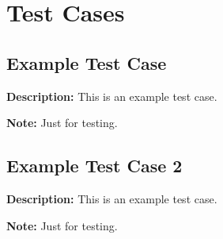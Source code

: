 \chapter{Test Cases}
\section{Example Test Case}\label{TESTCASEExampleTestcase}
\textbf{Description:} This is an example test case.

\textbf{Note:} Just for testing.
\section{Example Test Case 2}\label{TESTCASEExampleTestcase2}
\textbf{Description:} This is an example test case.

\textbf{Note:} Just for testing.
